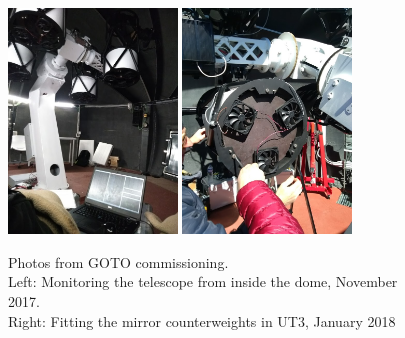 \begin{colsection}
\begin{colsection}
\begin{figure}[t]
    \begin{center}
        \includegraphics[width=0.4\textwidth]{images/commissioning_photo.jpg}
        \includegraphics[width=0.4\textwidth]{images/commissioning_photo3.jpg}
    \end{center}
    \caption[Photos from GOTO commissioning]{
        Photos from GOTO commissioning.\\
        Left: Monitoring the telescope from inside the dome, November 2017.\\
        Right: Fitting the mirror counterweights in UT3, January 2018
    }\label{fig:commissioning}
\end{figure}


\end{colsection}
\end{colsection}

